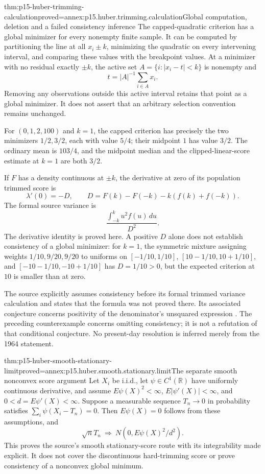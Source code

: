 \begin{hbtheorem}{thm:p15-huber-trimming-calculation}{proved=annex:p15.huber.trimming.calculation}{Global computation, deletion and a failed consistency inference}
The capped-quadratic criterion has a global minimizer for every
nonempty finite sample. It can be computed by partitioning the line
at all \(x_i\pm k\), minimizing the quadratic on every intervening
interval, and comparing these values with the breakpoint values.
At a minimizer with no residual exactly \(\pm k\), the active set
\(A=\{i:|x_i-t|<k\}\) is nonempty and
\[
                       t=|A|^{-1}\sum_{i\in A}x_i .
\]
Removing any observations outside this active interval retains
that point as a global minimizer. It does not assert that an arbitrary
selection convention remains unchanged.

For \((0,1,2,100)\) and \(k=1\), the capped criterion has precisely
the two minimizers \(1/2,3/2\), each with value \(5/4\);
their midpoint \(1\) has value \(3/2\).
The ordinary mean is \(103/4\), and the midpoint median and
the clipped-linear-score estimate at \(k=1\) are both \(3/2\).

If \(F\) has a density continuous at \(\pm k\), the derivative
at zero of its population trimmed score is
\[
 \lambda'(0)=-D,\qquad
 D=F(k)-F(-k)-k(f(k)+f(-k)).
\]
The formal source variance is
\[
 \frac{\int_{-k}^{k}u^2f(u)\,du}{D^2}.
\]
The derivative identity is proved here. A positive \(D\) alone
does not establish consistency of a global minimizer: for \(k=1\),
the symmetric mixture assigning weights \(1/10,9/20,9/20\)
to uniforms on \([-1/10,1/10]\), \([10-1/10,10+1/10]\),
and \([-10-1/10,-10+1/10]\) has \(D=1/10>0\), but the
expected criterion at \(10\) is smaller than at zero.
\end{hbtheorem}

The source explicitly assumes consistency before its formal trimmed
variance calculation and states that the formula was not proved there.
Its associated conjecture concerns positivity of the denominator's
unsquared expression \cite[p.~79]{Huber1964RobustLocation}.
The preceding counterexample concerns omitting consistency; it is
not a refutation of that conditional conjecture. No present-day
resolution is inferred merely from the 1964 statement.

\begin{hbtheorem}{thm:p15-huber-smooth-stationary-limit}{proved=annex:p15.huber.smooth.stationary.limit}{The separate smooth nonconvex score argument}
Let \(X_i\) be i.i.d., let \(\psi\in C^1(\mathbb R)\) have uniformly
continuous derivative, and assume \(E\psi(X)^2<\infty\),
\(E|\psi'(X)|<\infty\), and \(0<d=E\psi'(X)<\infty\).
Suppose a measurable sequence \(T_n\to0\) in probability satisfies
\(\sum_i\psi(X_i-T_n)=0\).
Then \(E\psi(X)=0\) follows from these assumptions, and
\[
                 \sqrt nT_n\ \Longrightarrow\
                 N(0,E\psi(X)^2/d^2).
\]
This proves the source's smooth stationary-score route with its
integrability made explicit. It does not cover the discontinuous
hard-trimming score or prove consistency of a nonconvex global minimum.
\end{hbtheorem}

